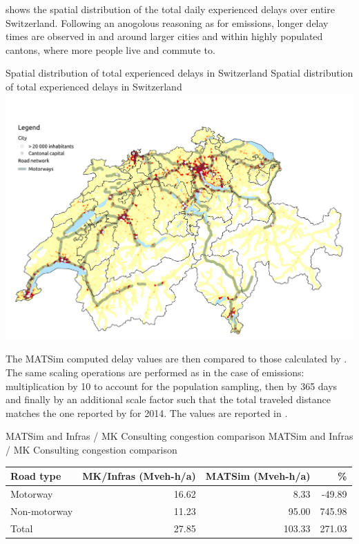  shows the spatial distribution of the total daily experienced delays over entire Switzerland.
Following an anogolous reasoning as for emissions, longer delay times are observed in and around larger cities and within highly populated cantons, where more people live and commute to.

\createfigure%
{Spatial distribution of total experienced delays in Switzerland}%
{Spatial distribution of total experienced delays in Switzerland}%
{\label{fig:spatialDelays}}%
{\includegraphics[width=1.0\textwidth, angle=0]{figures/total_delays_heatmap.pdf}}%
{}

The MATSim computed delay values are then compared to those calculated by \citet{mkinfras2016staukosten}.
The same scaling operations are performed as in the case of emissions: multiplication by 10 to account for the population sampling, then by 365 days and finally by an additional scale factor such that the total traveled distance matches the one reported by \citet{mkinfras2016staukosten} for 2014.
The values are reported in .


\createtable%
{MATSim and Infras / MK Consulting congestion comparison}%
{MATSim and Infras / MK Consulting congestion comparison}%
{\label{tab:delayValueComparison}}%
{%
  \begin{tabular}[c]{lrrr}
    \toprule
    Road type & MK/Infras (Mveh-h/a) & MATSim (Mveh-h/a) & \%  \\ 
    \midrule
    Motorway      & 16.62 &    8.33 &  -49.89 \\
    Non-motorway  & 11.23 &   95.00 &  745.98 \\
    Total &         27.85 &  103.33 &  271.03 \\
    \bottomrule
  \end{tabular}
}%
{}

